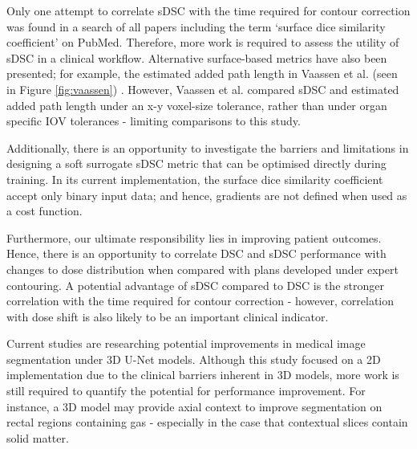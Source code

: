 Only one attempt to correlate sDSC with the time required for contour correction
was found in a search of all papers including the term `surface dice similarity
coefficient' on PubMed. Therefore, more work is required to assess the utility
of sDSC in a clinical workflow. Alternative surface-based metrics have also been
presented; for example, the estimated added path length in Vaassen et al. (seen
in Figure \ref{fig:vaassen}) \cite{Vaassen_2020}. However, Vaassen et al.
compared sDSC and estimated added path length under an x-y voxel-size tolerance,
rather than under organ specific IOV tolerances \cite{Vaassen_2020} - limiting
comparisons to this study.

Additionally, there is an opportunity to investigate the barriers and
limitations in designing a soft surrogate sDSC metric that can be optimised
directly during training. In its current implementation, the surface dice
similarity coefficient accept only binary input data; and hence, gradients are
not defined when used as a cost function.

Furthermore, our ultimate responsibility lies in improving patient outcomes.
Hence, there is an opportunity to correlate DSC and sDSC performance with
changes to dose distribution when compared with plans developed under expert
contouring. A potential advantage of sDSC compared to DSC is the stronger
correlation with the time required for contour correction - however, correlation
with dose shift is also likely to be an important clinical indicator.

Current studies are researching potential improvements in medical image
segmentation under 3D U-Net models. Although this study focused on a 2D
implementation due to the clinical barriers inherent in 3D models, more work is
still required to quantify the potential for performance improvement.
For instance, a 3D model may provide axial context to improve segmentation on
rectal regions containing gas - especially in the case that contextual slices
contain solid matter.
